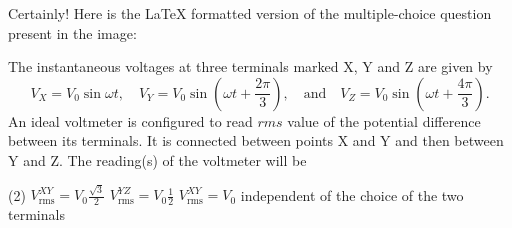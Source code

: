 Certainly! Here is the LaTeX formatted version of the multiple-choice question present in the image:


    \item The instantaneous voltages at three terminals marked X, Y and Z are given by
    \[
    V_X = V_0 \sin \omega t, \quad V_Y = V_0 \sin \left( \omega t + \frac{2\pi}{3} \right), \quad \text{and} \quad V_Z = V_0 \sin \left( \omega t + \frac{4\pi}{3} \right).
    \]
    An ideal voltmeter is configured to read \(rms\) value of the potential difference between its terminals. It is connected between points X and Y and then between Y and Z. The reading(s) of the voltmeter will be
        \begin{tasks}(2)
            \task \( V_{\text{rms}}^{XY} = V_0 \frac{\sqrt{3}}{2} \)
            \task \( V_{\text{rms}}^{YZ} = V_0 \frac{1}{2} \)
            \task \( V_{\text{rms}}^{XY} = V_0 \)
            \task independent of the choice of the two terminals
        \end{tasks}
